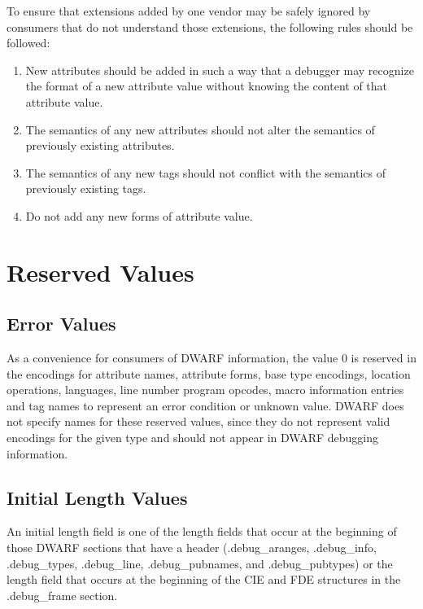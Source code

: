 To ensure that extensions added by one vendor may be safely
ignored by consumers that do not understand those extensions,
the following rules should be followed:

\begin{enumerate}[1.]
\item New attributes should be added in such a way that a
debugger may recognize the format of a new attribute value
without knowing the content of that attribute value.

\item The semantics of any new attributes should not alter
the semantics of previously existing attributes.

\item The semantics of any new tags should not conflict with
the semantics of previously existing tags.

\item Do not add any new forms of attribute value.

\end{enumerate}


\section{Reserved Values}
\label{datarep:reservedvalues}
\subsection{Error Values}
\label{datarep:errorvalues}

As a convenience for consumers of DWARF information, the value
0 is reserved in the encodings for attribute names, attribute
forms, base type encodings, location operations, languages,
line number program opcodes, macro information entries and tag
names to represent an error condition or unknown value. DWARF
does not specify names for these reserved values, since they
do not represent valid encodings for the given type and should
not appear in DWARF debugging information.


\subsection{Initial Length Values}
\label{datarep:initiallengthvalues}

An initial length field is one of the length fields that occur
at the beginning of those DWARF sections that have a header
(.debug\_aranges, .debug\_info, .debug\_types, .debug\_line,
.debug\_pubnames, and .debug\_pubtypes) or the length field
that occurs at the beginning of the CIE and FDE structures
in the .debug\_frame section.


